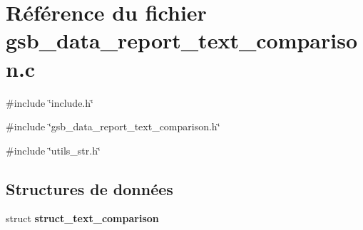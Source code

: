 \section{Référence du fichier gsb\_\-data\_\-report\_\-text\_\-comparison.c}
\label{gsb__data__report__text__comparison_8c}
{\ttfamily \#include \char`\"{}include.h\char`\"{}}\par
{\ttfamily \#include \char`\"{}gsb\_\-data\_\-report\_\-text\_\-comparison.h\char`\"{}}\par
{\ttfamily \#include \char`\"{}utils\_\-str.h\char`\"{}}\par
\subsection*{Structures de données}
\begin{DoxyCompactItemize}
\item 
struct {\bf struct\_\-text\_\-comparison}
\end{DoxyCompactItemize}
